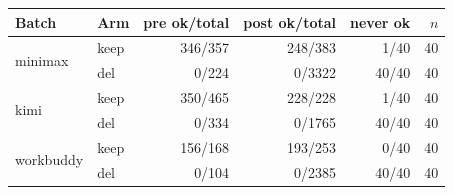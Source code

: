 \begin{tabular}{llrrrr}
\toprule
Batch & Arm & pre ok/total & post ok/total & never ok & $n$ \\
\midrule
\multirow{2}{*}{minimax} & keep & 346/357 & 248/383 & 1/40 & 40 \\
 & del  & 0/224 & 0/3322 & 40/40 & 40 \\
\midrule
\multirow{2}{*}{kimi} & keep & 350/465 & 228/228 & 1/40 & 40 \\
 & del  & 0/334 & 0/1765 & 40/40 & 40 \\
\midrule
\multirow{2}{*}{workbuddy} & keep & 156/168 & 193/253 & 0/40 & 40 \\
 & del  & 0/104 & 0/2385 & 40/40 & 40 \\
\bottomrule
\end{tabular}
